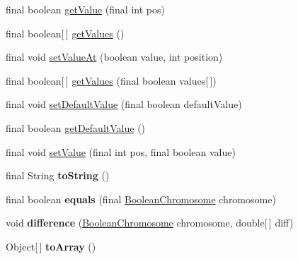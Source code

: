 \begin{CompactItemize}
\item 
final boolean \hyperlink{classjenes_1_1chromosome_1_1_boolean_chromosome_6edb214f001732cfd6af9bbac3a23515}{getValue} (final int pos)
\item 
final boolean\mbox{[}$\,$\mbox{]} \hyperlink{classjenes_1_1chromosome_1_1_boolean_chromosome_27db9ee77a97d896d0cdafc726681272}{getValues} ()
\item 
final void \hyperlink{classjenes_1_1chromosome_1_1_boolean_chromosome_9bd35e276f2739f19fa7a695c85f415c}{setValueAt} (boolean value, int position)
\item 
final boolean\mbox{[}$\,$\mbox{]} \hyperlink{classjenes_1_1chromosome_1_1_boolean_chromosome_afccb6ebf217d02c0502e185b1972f82}{getValues} (final boolean values\mbox{[}$\,$\mbox{]})
\item 
final void \hyperlink{classjenes_1_1chromosome_1_1_boolean_chromosome_3730cbcd4d048349f134593db820566d}{setDefaultValue} (final boolean defaultValue)
\item 
final boolean \hyperlink{classjenes_1_1chromosome_1_1_boolean_chromosome_9b75f626b2b5fbc90215a53ac91d24a7}{getDefaultValue} ()
\item 
final void \hyperlink{classjenes_1_1chromosome_1_1_boolean_chromosome_b37e05ed7a30e43b740f0c2d9c548e88}{setValue} (final int pos, final boolean value)
\item 
\hypertarget{classjenes_1_1chromosome_1_1_boolean_chromosome_17ecce8325cc2ba6b1703551768c245f}{
final String \textbf{toString} ()}
\label{classjenes_1_1chromosome_1_1_boolean_chromosome_17ecce8325cc2ba6b1703551768c245f}

\item 
\hypertarget{classjenes_1_1chromosome_1_1_boolean_chromosome_82b50fe50a7e8821ee3ae5cc96bca013}{
final boolean \textbf{equals} (final \hyperlink{classjenes_1_1chromosome_1_1_boolean_chromosome}{BooleanChromosome} chromosome)}
\label{classjenes_1_1chromosome_1_1_boolean_chromosome_82b50fe50a7e8821ee3ae5cc96bca013}

\item 
\hypertarget{classjenes_1_1chromosome_1_1_boolean_chromosome_0d602ca5a958ee2712963602d2f1eee9}{
void \textbf{difference} (\hyperlink{classjenes_1_1chromosome_1_1_boolean_chromosome}{BooleanChromosome} chromosome, double\mbox{[}$\,$\mbox{]} diff)}
\label{classjenes_1_1chromosome_1_1_boolean_chromosome_0d602ca5a958ee2712963602d2f1eee9}

\item 
\hypertarget{classjenes_1_1chromosome_1_1_boolean_chromosome_3ff06b819a640b0e89935d99cc69d3ac}{
Object\mbox{[}$\,$\mbox{]} \textbf{toArray} ()}
\label{classjenes_1_1chromosome_1_1_boolean_chromosome_3ff06b819a640b0e89935d99cc69d3ac}

\end{CompactItemize}


